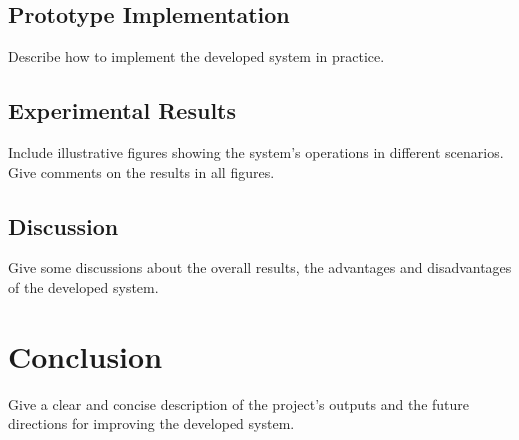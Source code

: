\documentclass[conference, onecolumn]{IEEEtran}
\begin{document}
\subsection{Prototype Implementation}
Describe how to implement the developed system in practice. 

\subsection{Experimental Results}
Include illustrative figures showing the system's operations in different scenarios. Give comments on the results in all figures.

\subsection{Discussion}
Give some discussions about the overall results, the advantages and disadvantages of the developed system.

\section{Conclusion}
Give a clear and concise description of the project’s outputs and the future directions for improving the developed system.


\end{document}
